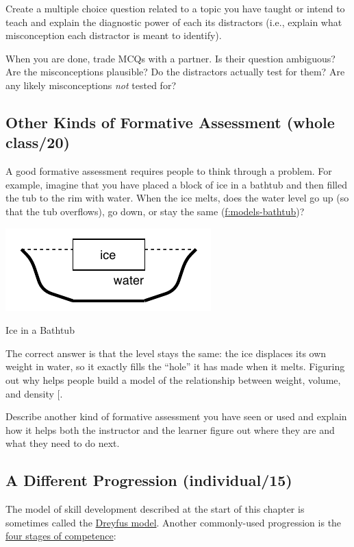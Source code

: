 Create a multiple choice question related to a topic you have taught or
intend to teach and explain the diagnostic power of each its distractors
(i.e., explain what misconception each distractor is meant to identify).

When you are done, trade MCQs with a partner. Is their question
ambiguous? Are the misconceptions plausible? Do the distractors actually
test for them? Are any likely misconceptions \emph{not} tested for?

\subsection{Other Kinds of Formative Assessment (whole class/20)}\label{other-kinds-of-formative-assessment-whole-class20}

A good formative assessment requires people to think through a problem.
For example, imagine that you have placed a block of ice in a bathtub
and then filled the tub to the rim with water. When the ice melts, does
the water level go up (so that the tub overflows), go down, or stay the
same (\protect\hyperlink{FIGURE}{f:models-bathtub})?

\includegraphics{../../files/bathtub.pdf}

Ice in a Bathtub

The correct answer is that the level stays the same: the ice displaces
its own weight in water, so it exactly fills the ``hole'' it has made when
it melts. Figuring out why helps people build a model of the
relationship between weight, volume, and density {[}\protect[\hyperlink{b:Epst2002}{Epst2002}]{]}.

Describe another kind of formative assessment you have seen or used and
explain how it helps both the instructor and the learner figure out
where they are and what they need to do next.

\subsection{A Different Progression (individual/15)}\label{a-different-progression-individual15}

The model of skill development described at the start of this chapter
is sometimes called the \href{https://en.wikipedia.org/wiki/Dreyfus_model_of_skill_acquisition}{Dreyfus model}. Another
commonly-used progression is the \href{https://en.wikipedia.org/wiki/Four_stages_of_competence}{four stages of
competence}:

